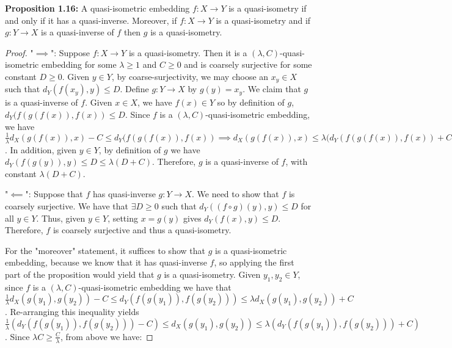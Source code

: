 \documentclass[12pt]{article}
\newcommand{\vs}{\vskip10pt}
\begin{document}
	\vs 
	
	\textbf{Proposition 1.16: } A quasi-isometric embedding $f: X \rightarrow Y$ is a quasi-isometry if and only if it has a quasi-inverse. Moreover, if $f: X \rightarrow Y$ is a quasi-isometry and if $g: Y \rightarrow X$ is a quasi-inverse of $f$ then $g$ is a quasi-isometry.
	
 	\begin{proof}
 		
 		"$\implies$": Suppose $f: X \rightarrow Y$ is a quasi-isometry. Then it is a $(\lambda, C)$-quasi-isometric embedding for some $\lambda \geq 1$ and $C \geq 0$ and is coarsely surjective for some constant $D \geq 0$. Given $y \in Y$, by coarse-surjectivity, we may choose an $x_y \in X$ such that $d_Y(f(x_y), y) \leq D$. Define $g: Y \rightarrow X$ by $g(y) = x_y$. We claim that $g$ is a quasi-inverse of $f$. Given $x \in X$, we have $f(x) \in Y$ so by definition of $g$, $d_Y(f(g(f(x)), f(x)) \leq D$. Since $f$ is a $(\lambda, C)$-quasi-isometric embedding, we have $\frac{1}{\lambda}d_X(g(f(x)), x) - C \leq d_Y(f(g(f(x)), f(x)) \implies d_X(g(f(x)), x) \leq \lambda(d_Y(f(g(f(x)), f(x)) + C) \leq \lambda(D + C)$. In addition, given $y \in Y$, by definition of $g$ we have $d_Y(f(g(y)), y) \leq D \leq \lambda(D + C)$. Therefore, $g$ is a quasi-inverse of $f$, with constant $\lambda(D + C)$. 
 		
 		\vs 
 		
 		"$\impliedby$": Suppose that $f$ has quasi-inverse $g: Y \rightarrow X$. We need to show that $f$ is coarsely surjective. We have that $\exists D \geq 0$ such that $d_Y((f \circ g)(y), y) \leq D$ for all $y \in Y$. Thus, given $y \in Y$, setting $x = g(y)$ gives $d_Y(f(x), y) \leq D$. Therefore, $f$ is coarsely surjective and thus a quasi-isometry. 
 		
 		\vs 
 		
 		For the "moreover" statement, it suffices to show that $g$ is a quasi-isometric embedding, because we know that it has quasi-inverse $f$, so applying the first part of the proposition would yield that $g$ is a quasi-isometry. 
 		\vs
 		Given $y_1, y_2 \in Y$, since $f$ is a $(\lambda, C)$-quasi-isometric embedding we have that $\frac{1}{\lambda} d_X(g(y_1), g(y_2)) - C \leq d_Y(f(g(y_1)), f(g(y_2))) \leq \lambda d_X(g(y_1), g(y_2)) + C$. Re-arranging this inequality yields $\frac{1}{\lambda} (d_Y(f(g(y_1)), f(g(y_2))) - C) \leq d_X(g(y_1), g(y_2)) \leq \lambda (d_Y(f(g(y_1)), f(g(y_2))) + C) $. Since $\lambda C \geq \frac{C}{\lambda}$, from above we have: 
 		

\end{proof}
\end{document}

